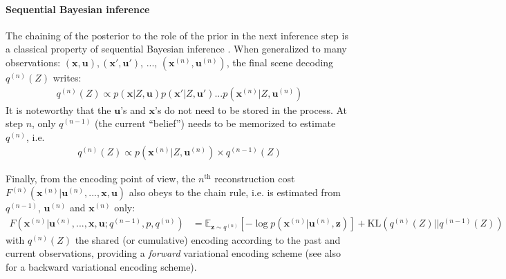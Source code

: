 \documentclass{article}
\begin{document}
\paragraph{Sequential Bayesian inference}

The chaining of the posterior to the role of the prior in the next inference step is a classical property of sequential Bayesian inference \cite{wald1945sequential}.
When generalized to many observations: $(\boldsymbol{x},\boldsymbol{u}), (\boldsymbol{x}',\boldsymbol{u}')$, ..., $(\boldsymbol{x}^{(n)},\boldsymbol{u}^{(n)})$, the final scene decoding $q^{(n)}(Z)$ writes:
\begin{align}
q^{(n)}(Z) \propto p(\boldsymbol{x}|Z,\boldsymbol{u}) p(\boldsymbol{x}'|Z,\boldsymbol{u}') ... p(\boldsymbol{x}^{(n)}|Z,\boldsymbol{u}^{(n)}) \label{eq:accum}
\end{align}
It is noteworthy that the $\boldsymbol{u}$'s and $\boldsymbol{x}$'s do not need to be stored in the process. At step $n$, only $q^{(n-1)}$ (the current ``belief'') needs to be memorized to estimate $q^{(n)}$, i.e. 
\begin{align} 
q^{(n)}(Z) \propto p(\boldsymbol{x}^{(n)}|Z,\boldsymbol{u}^{(n)}) \times q^{(n-1)}(Z) \label{eq:accum-post}
\end{align}

Finally, from the encoding point of view, the $n^\text{th}$ reconstruction cost $F^{(n)}(\boldsymbol{x}^{(n)}|\boldsymbol{u}^{(n)}, ..., \boldsymbol{x}, \boldsymbol{u})$ also obeys to the chain rule, i.e. is estimated from $q^{(n-1)}$, $\boldsymbol{u}^{(n)}$ and $\boldsymbol{x}^{(n)}$ only:
\begin{align}
F(\boldsymbol{x}^{(n)}|\boldsymbol{u}^{(n)}, ...,  \boldsymbol{x}, \boldsymbol{u}; q^{(n-1)}, p, q^{(n)}) 
&= \mathbb{E}_{\boldsymbol{z} \sim q^{(n)}} \left[-\log p(\boldsymbol{x}^{(n)}| \boldsymbol{u}^{(n)}, \boldsymbol{z})\right] + \text{KL}(q^{(n)}(Z)||q^{(n-1)}(Z))
\label{eq:FEP-uxun}
\end{align}
with $q^{(n)}(Z)$ the shared (or cumulative) encoding according to the past and current observations, providing a \emph{forward} variational encoding scheme (see also \cite{fraccaro2016sequential} for a backward variational encoding scheme). 
\end{document}

